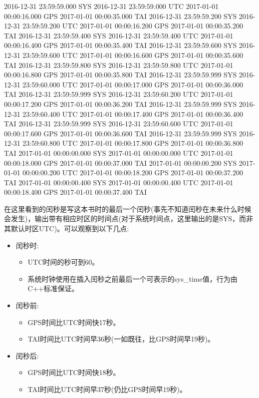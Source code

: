 \begin{shell}
2016-12-31 23:59:59.000 SYS 2016-12-31 23:59:59.000 UTC 2017-01-01 00:00:16.000 GPS 2017-01-01 00:00:35.000 TAI
2016-12-31 23:59:59.200 SYS 2016-12-31 23:59:59.200 UTC 2017-01-01 00:00:16.200 GPS 2017-01-01 00:00:35.200 TAI
2016-12-31 23:59:59.400 SYS 2016-12-31 23:59:59.400 UTC 2017-01-01 00:00:16.400 GPS 2017-01-01 00:00:35.400 TAI
2016-12-31 23:59:59.600 SYS 2016-12-31 23:59:59.600 UTC 2017-01-01 00:00:16.600 GPS 2017-01-01 00:00:35.600 TAI
2016-12-31 23:59:59.800 SYS 2016-12-31 23:59:59.800 UTC 2017-01-01 00:00:16.800 GPS 2017-01-01 00:00:35.800 TAI
2016-12-31 23:59:59.999 SYS 2016-12-31 23:59:60.000 UTC 2017-01-01 00:00:17.000 GPS 2017-01-01 00:00:36.000 TAI
2016-12-31 23:59:59.999 SYS 2016-12-31 23:59:60.200 UTC 2017-01-01 00:00:17.200 GPS 2017-01-01 00:00:36.200 TAI
2016-12-31 23:59:59.999 SYS 2016-12-31 23:59:60.400 UTC 2017-01-01 00:00:17.400 GPS 2017-01-01 00:00:36.400 TAI
2016-12-31 23:59:59.999 SYS 2016-12-31 23:59:60.600 UTC 2017-01-01 00:00:17.600 GPS 2017-01-01 00:00:36.600 TAI
2016-12-31 23:59:59.999 SYS 2016-12-31 23:59:60.800 UTC 2017-01-01 00:00:17.800 GPS 2017-01-01 00:00:36.800 TAI
2017-01-01 00:00:00.000 SYS 2017-01-01 00:00:00.000 UTC 2017-01-01 00:00:18.000 GPS 2017-01-01 00:00:37.000 TAI
2017-01-01 00:00:00.200 SYS 2017-01-01 00:00:00.200 UTC 2017-01-01 00:00:18.200 GPS 2017-01-01 00:00:37.200 TAI
2017-01-01 00:00:00.400 SYS 2017-01-01 00:00:00.400 UTC 2017-01-01 00:00:18.400 GPS 2017-01-01 00:00:37.400 TAI
\end{shell}

在这里看到的闰秒是写这本书时的最后一个闰秒(事先不知道闰秒在未来什么时候会发生)，输出带有相应时区的时间点(对于系统时间点，这里输出的是SYS，而非其默认时区UTC)。可以观察到以下几点:

\begin{itemize}
\item 
闰秒时:

\begin{itemize}
\item 
UTC时间的秒可到60。

\item 
系统时钟使用在插入闰秒之前最后一个可表示的sys\_time值，行为由C++标准保证。
\end{itemize}

\item 
闰秒前:

\begin{itemize}
\item 
GPS时间比UTC时间快17秒。

\item 
TAI时间比UTC时间早36秒(一如既往，比GPS时间早19秒)。
\end{itemize}

\item 
闰秒后:

\begin{itemize}
\item 
GPS时间比UTC时间快18秒。

\item 
TAI时间比UTC时间早37秒(仍比GPS时间早19秒)。
\end{itemize}
\end{itemize}

